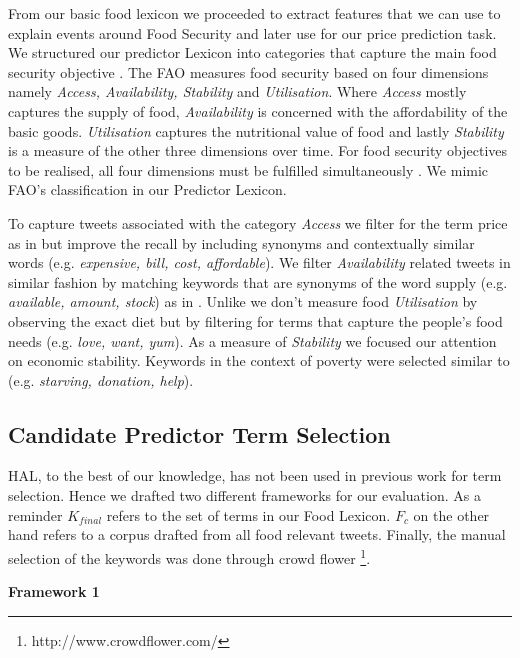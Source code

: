 From our basic food lexicon we proceeded to extract features that we can use to explain events around Food Security and later use for our price prediction task. We structured our predictor Lexicon into categories that capture the main food security objective . The FAO measures food security based on four dimensions namely \emph{Access, Availability, Stability} and \emph{Utilisation}. Where \emph{Access} mostly captures the supply of food, \emph{Availability} is concerned with the affordability of the basic goods. \emph{Utilisation} captures the nutritional value of food and lastly \emph{Stability} is a measure of the other three dimensions over time. For food security objectives to be realised, all four dimensions must be fulfilled simultaneously \cite{fao2008}. We mimic FAO's classification in our Predictor Lexicon. 

To capture tweets associated with the category \emph{Access} we filter for the term price as in \cite{ungp2013} but improve the recall by including synonyms and contextually similar words (e.g. \emph{expensive, bill, cost, affordable}). We filter \emph{Availability} related tweets in similar fashion by matching keywords that are synonyms of the word supply (e.g. \emph{available, amount, stock}) as in \cite{hum14}. Unlike \cite{AbbarMW14} we don't measure food \emph{Utilisation} by observing the exact diet but by filtering for terms that capture the people's food needs (e.g. \emph{love, want, yum}). As a measure of \emph{Stability} we focused our attention on economic stability. Keywords in the context of poverty were selected similar to \cite{RePEc} \cite{hum14} (e.g. \emph{starving, donation, help}).



\subsection{Candidate Predictor Term Selection}

HAL, to the best of our knowledge, has not been used in previous work for term selection. Hence we drafted two different frameworks for our evaluation. As a reminder $K_{final}$ refers to the set of terms in our Food Lexicon. $F_c$ on the other hand refers to a corpus drafted from all food relevant tweets. Finally, the manual selection of the keywords was done through crowd flower \footnote{http://www.crowdflower.com/}. 


\textbf{Framework 1}

